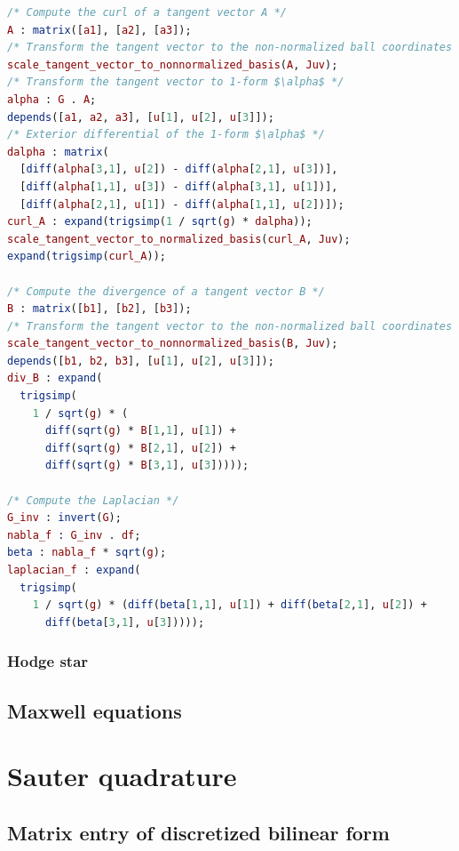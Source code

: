 \documentclass[11pt, a4paper]{book}
\begin{document}
\begin{lstlisting}[caption={Maxima code for computing gradient, curl, divergence and
    Laplacian in the ball coordinate chart.}, label={lst:dg-ball-coordinates-normalized},
  language=maxima]
/* Compute the curl of a tangent vector A */
A : matrix([a1], [a2], [a3]);
/* Transform the tangent vector to the non-normalized ball coordinates */
scale_tangent_vector_to_nonnormalized_basis(A, Juv);
/* Transform the tangent vector to 1-form $\alpha$ */
alpha : G . A;
depends([a1, a2, a3], [u[1], u[2], u[3]]);
/* Exterior differential of the 1-form $\alpha$ */
dalpha : matrix(
  [diff(alpha[3,1], u[2]) - diff(alpha[2,1], u[3])],
  [diff(alpha[1,1], u[3]) - diff(alpha[3,1], u[1])],
  [diff(alpha[2,1], u[1]) - diff(alpha[1,1], u[2])]);
curl_A : expand(trigsimp(1 / sqrt(g) * dalpha));
scale_tangent_vector_to_normalized_basis(curl_A, Juv);
expand(trigsimp(curl_A));

/* Compute the divergence of a tangent vector B */
B : matrix([b1], [b2], [b3]);
/* Transform the tangent vector to the non-normalized ball coordinates */
scale_tangent_vector_to_nonnormalized_basis(B, Juv);
depends([b1, b2, b3], [u[1], u[2], u[3]]);
div_B : expand(
  trigsimp(
    1 / sqrt(g) * (
      diff(sqrt(g) * B[1,1], u[1]) +
      diff(sqrt(g) * B[2,1], u[2]) +
      diff(sqrt(g) * B[3,1], u[3]))));

/* Compute the Laplacian */
G_inv : invert(G);
nabla_f : G_inv . df;
beta : nabla_f * sqrt(g);
laplacian_f : expand(
  trigsimp(
    1 / sqrt(g) * (diff(beta[1,1], u[1]) + diff(beta[2,1], u[2]) +
      diff(beta[3,1], u[3]))));
\end{lstlisting}

\subsection{Hodge star}

\section{Maxwell equations}

\chapter{Sauter quadrature}
\label{sec:sauter-quad}

\section{Matrix entry of discretized bilinear form}
\end{document}
